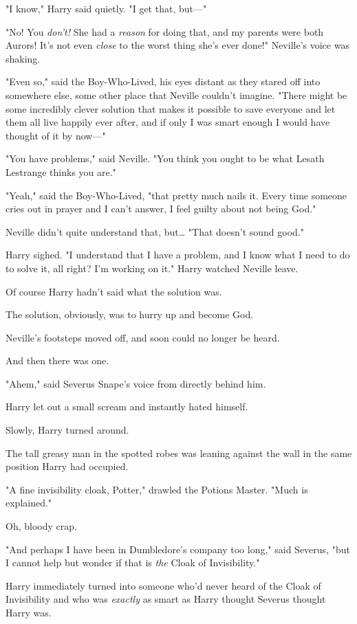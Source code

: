 "I know," Harry said quietly. "I get that, but---"

"No! You \emph{don't!} She had a \emph{reason} for doing that, and my parents
were both Aurors! It's not even \emph{close} to the worst thing she's ever
done!" Neville's voice was shaking.

"Even so," said the Boy-Who-Lived, his eyes distant as they stared off into
somewhere else, some other place that Neville couldn't imagine. "There might be
some incredibly clever solution that makes it possible to save everyone and let
them all live happily ever after, and if only I was smart enough I would have
thought of it by now---"

"You have problems," said Neville. "You think you ought to be what Lesath
Lestrange thinks you are."

"Yeah," said the Boy-Who-Lived, "that pretty much nails it. Every time someone
cries out in prayer and I can't answer, I feel guilty about not being God."

Neville didn't quite understand that, but{\ldots} "That doesn't sound good."

Harry sighed. "I understand that I have a problem, and I know what I need to do
to solve it, all right? I'm working on it."
\later
Harry watched Neville leave.

Of course Harry hadn't said what the solution was.

The solution, obviously, was to hurry up and become God.

Neville's footsteps moved off, and soon could no longer be heard.

And then there was one.

"Ahem," said Severus Snape's voice from directly behind him.

Harry let out a small scream and instantly hated himself.

Slowly, Harry turned around.

The tall greasy man in the spotted robes was leaning against the wall in the
same position Harry had occupied.

"A fine invisibility cloak, Potter," drawled the Potions Master. "Much is
explained."

Oh, bloody crap.

"And perhaps I have been in Dumbledore's company too long," said Severus, "but
I cannot help but wonder if that is \emph{the} Cloak of Invisibility."

Harry immediately turned into someone who'd never heard of the Cloak of
Invisibility and who was \emph{exactly} as smart as Harry thought Severus
thought Harry was.

